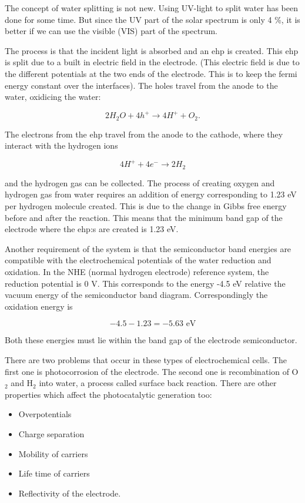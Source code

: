 \documentclass[a4paper,12pt]{article}
\begin{document}
The concept of water splitting is not new. Using UV-light to split water has been done for some time. But since the UV part of the solar spectrum is only 4 \%, it is better if we can use the visible (VIS) part of the spectrum. 

The process is that the incident light is absorbed and an ehp is created. This ehp is split due to a built in electric field in the electrode. (This electric field is due to the different potentials at the two ends of the electrode. This is to keep the fermi energy constant over the interfaces). The holes travel from the anode to the water, oxidicing the water: 

\[2H_2O + 4h^+ \rightarrow 4H^+ + O_2.\]

The electrons from the ehp travel from the anode to the cathode, where they interact with the hydrogen ions

\[4H^+ + 4e^- \rightarrow 2H_2\]

and the hydrogen gas can be collected. The process of creating oxygen and hydrogen gas from water requires an addition of energy corresponding to 1.23 eV per hydrogen molecule created. This is due to the change in Gibbs free energy before and after the reaction. This means that the minimum band gap of the electrode where the ehp:s are created is 1.23 eV. 

Another requirement of the system is that the semiconductor band energies are compatible with the electrochemical potentials of the water reduction and oxidation. In the NHE (normal hydrogen electrode) reference system, the reduction potential is 0 V. This corresponds to the energy -4.5 eV relative the vacuum energy of the semiconductor band diagram. Correspondingly the oxidation energy is 

\[-4.5 - 1.23 = -5.63 \,\, \mathrm{eV}\]

Both these energies must lie within the band gap of the electrode semiconductor. 

There are two problems that occur in these types of electrochemical cells. The first one is photocorrosion of the electrode. The second one is recombination of O$_2$ and H$_2$ into water, a process called surface back reaction. There are other properties which affect the photocatalytic generation too: 

\begin{itemize}
\item Overpotentials
\item Charge separation
\item Mobility of carriers
\item Life time of carriers
\item Reflectivity of the electrode. 
\end{itemize}
\end{document}

